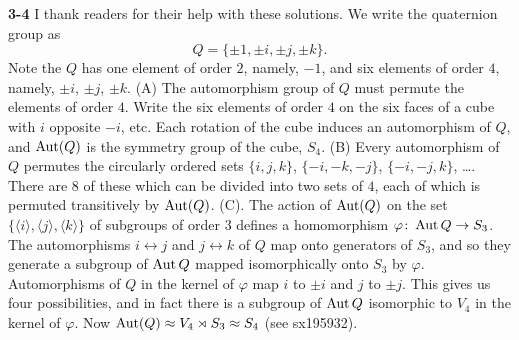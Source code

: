 \documentclass[a4paper,11pt,final]{memoir}%
\theoremstyle{nonumberplain}
\begin{document}
\bigskip\noindent\textbf{3-4}
I thank readers for their help with these solutions. We write the quaternion
group as%
\[
Q=\{\pm1,\pm i,\pm j,\pm k\}.
\]
Note the $Q$ has one element of order $2$, namely, $-1$, and six
elements of order $4$, namely, $\pm i$, $\pm j$, $\pm k$.
\noindent(A) The automorphism group of $Q$ must permute the elements of order $4$.
Write the six elements of order $4$ on the six faces
of a cube with $i$ opposite $-i$, etc. Each rotation of the cube induces an
automorphism of $Q$, and $\operatorname{Aut}(Q)$ is the symmetry group of the cube, $S_{4}$.
\noindent(B) Every automorphism
of $Q$ permutes the circularly ordered sets $\{i,j,k\}$, $\{-i,-k,-j\}$,
$\{-i,-j,k\}$, \ldots.
There are $8$ of these which can be divided into two sets of $4$,
each of which is permuted
transitively by $\operatorname{Aut}(Q)$.
\noindent(C). The action of $\operatorname{Aut}(Q)$ on the set
$\{\langle i\rangle,\langle j\rangle,\langle k\rangle\}$ of subgroups
of order $3$ defines a homomorphism $\varphi\colon\operatorname{Aut}{Q}\to S_3$.
The automorphisms $i\leftrightarrow j$ and $j\leftrightarrow k$ of $Q$
map onto generators of $S_3$, and so they generate a subgroup of $\operatorname{Aut}{Q}$
mapped isomorphically onto $S_3$ by $\varphi$.
Automorphisms of $Q$ in the kernel of $\varphi$ map $i$ to $\pm i$
and $j$ to $\pm j$. This gives us four possibilities, and in fact
there is a subgroup of $\operatorname{Aut}{Q}$  isomorphic to $V_4$ in the kernel of
$\varphi$.
Now $\operatorname{Aut}(Q)\approx V_4\rtimes S_3\approx S_4$ (see sx195932).
\end{document}
